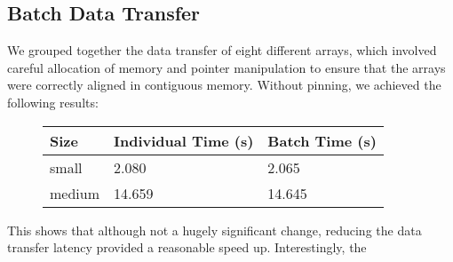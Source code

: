 \subsection*{Batch Data Transfer}
We grouped together the data transfer of eight different arrays, which involved careful allocation of memory and pointer manipulation to ensure that the arrays were correctly aligned in contiguous memory. Without pinning, we achieved the following results:

\begin{figure}[H]\centering \begin{tabular}{ l | l | l}
  \hline
  Size & Individual Time (s) & Batch Time (s)\\
  \hline
  \hline
  small & 2.080 & 2.065 \\
  medium & 14.659 & 14.645 \\
  \hline
\end{tabular} \end{figure}

This shows that although not a hugely significant change, reducing the data transfer latency provided a reasonable speed up. Interestingly, the